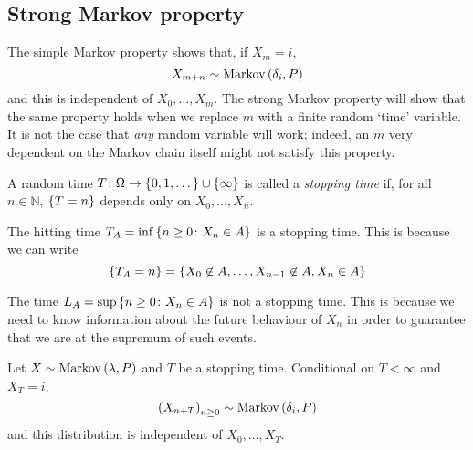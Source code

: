 \subsection{Strong Markov property}
The simple Markov property shows that, if \( X_m = i \),
\[
	X_{m + n} \sim \operatorname{Markov}\left({\delta_i, P}\right)
\]
and this is independent of \( X_0, \dots, X_m \).
The strong Markov property will show that the same property holds when we replace \( m \) with a finite random `time' variable.
It is not the case that \textit{any} random variable will work; indeed, an \( m \) very dependent on the Markov chain itself might not satisfy this property.
\begin{definition}
	A random time \( T \colon \Omega \to \qty{0, 1, \dots} \cup \qty{\infty} \) is called a \textit{stopping time} if, for all \( n \in \mathbb N \), \( \qty{ T = n } \) depends only on \( X_0, \dots, X_n \).
\end{definition}
\begin{example}
	The hitting time \( T_A = \inf \qty{ n \geq 0 \colon X_n \in A} \) is a stopping time.
	This is because we can write
	\[
		\qty{T_A = n} = \qty{X_0 \not\in A, \dots, X_{n-1} \not\in A, X_n \in A}
	\]
\end{example}
\begin{example}
	The time \( L_A = \sup \qty{n \geq 0 \colon X_n \in A} \) is not a stopping time.
	This is because we need to know information about the future behaviour of \( X_n \) in order to guarantee that we are at the supremum of such events.
\end{example}
\begin{theorem}
	Let \( X \sim \operatorname{Markov}\left({\lambda, P}\right) \) and \( T \) be a stopping time.
	Conditional on \( T < \infty \) and \( X_T = i \),
	\[
		\qty(X_{n + T})_{n \geq 0} \sim \operatorname{Markov}\left({\delta_i, P}\right)
	\]
	and this distribution is independent of \( X_0, \dots, X_T \).
\end{theorem}
